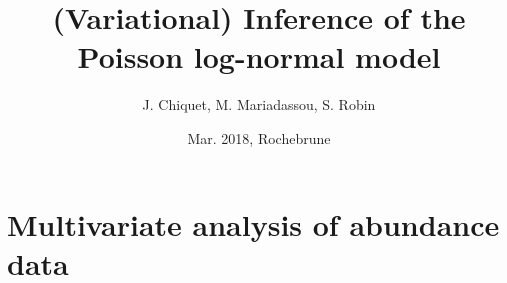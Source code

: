 \documentclass[9pt]{beamer}
\newcommand{\fignet}{/home/robin/Bureau/RECHERCHE/RESEAUX/EXPOSES/FIGURES}
\begin{document}

\title[(Variational)Inference of the PLN model]{(Variational) Inference of the Poisson log-normal model}

\author[S. Robin]{J. Chiquet, M. Mariadassou, S. Robin}


\date[Rochebrune]{Mar. 2018, Rochebrune}

\maketitle

\section{Multivariate analysis of abundance data}
\frame{\tableofcontents[currentsection]}


\end{document}
